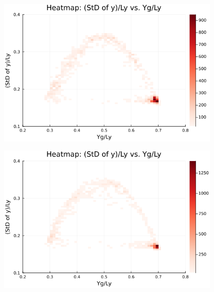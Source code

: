 \begin{figure}[H]
  \centering
  \includegraphics[scale=0.6]{image/RaRtmap_heat/2023-11-15T13:37:58.058__chi1.265_Ay50_rho0.4_T0.43_dT0.04_Rd0.0_Rt0.5_Ra0.938769_g0.0003999718779659611_run4.0e7_output.png}
  \label{}
\end{figure}

\begin{figure}[H]
  \centering
  \includegraphics[scale=0.6]{image/RaRtmap_heat/2023-11-15T14:30:22.529__chi1.265_Ay50_rho0.4_T0.43_dT0.04_Rd0.0_Rt0.5_Ra1.4081535_g0.0003999718779659611_run4.0e7_output.png}
  \label{}
\end{figure}

